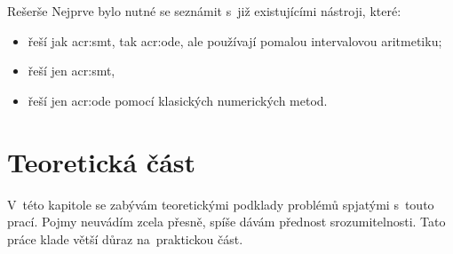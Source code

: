 \documentclass[thesis=M,czech]{FITthesis}[2012/06/26]
\newcommand{\acrlabel}[1]{acr:#1}
\newcommand{\acr}[1]{\acrshort{\acrlabel{#1}}}
\begin{document}
\begin{introduction}

\begin{section}{Rešerše}\label{s:intro:search}
Nejprve bylo nutné se seznámit
s~již existujícími nástroji, které:
\begin{itemize}
\item řeší jak \acr{smt}, tak \acr{ode},
   ale používají pomalou intervalovou aritmetiku;
\item řeší jen \acr{smt},
\item řeší jen \acr{ode} pomocí klasických numerických metod.
\end{itemize}
\end{section} %


\end{introduction}



\chapter{Teoretická část}\label{ch:theory}
V~této kapitole se zabývám
teoretickými podklady problémů spjatými s~touto prací.
Pojmy neuvádím zcela přesně,
spíše dávám přednost srozumitelnosti.
Tato práce klade větší důraz na~praktickou část.

\end{document}
